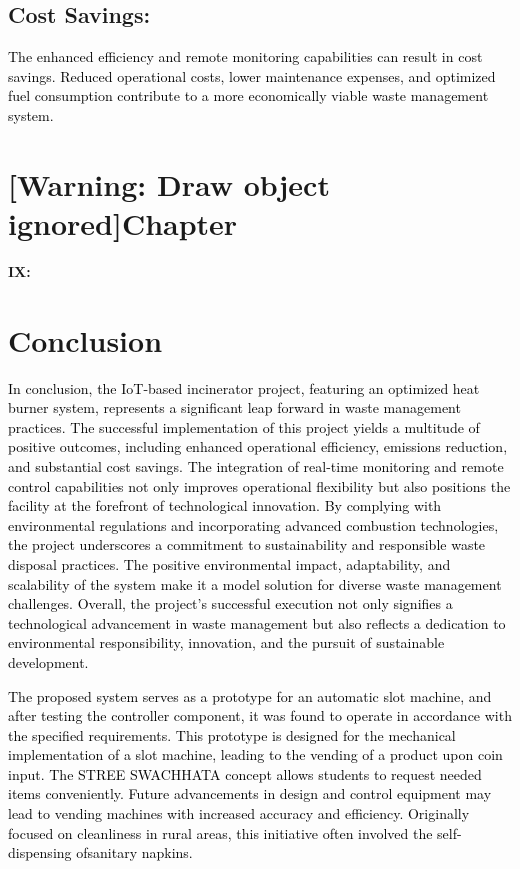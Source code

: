 \documentclass[letterpaper]{article}
\begin{document}
\subsection{Cost Savings:}
\textcolor{black}{The enhanced efficiency and remote monitoring capabilities can result in cost savings. Reduced
operational costs, lower maintenance expenses, and optimized fuel consumption contribute to a more economically viable
waste management system.}

\clearpage\setcounter{page}{1}\pagestyle{Convertedxx}
\section[Chapter]{[Warning: Draw object ignored]Chapter}
{\centering
\textbf{IX:}
\par}


\bigskip

\section[Conclusion]{Conclusion}

\bigskip

\textcolor{black}{In conclusion, the IoT-based incinerator project, featuring an optimized heat burner system,
represents a significant leap forward in waste management practices. The successful implementation of this project
yields a multitude of positive outcomes, including enhanced operational efficiency, emissions reduction, and
substantial cost savings. The integration of real-time monitoring and remote control capabilities not only improves
operational flexibility but also positions the facility at the forefront of technological innovation. By complying with
environmental regulations and incorporating advanced combustion technologies, the project underscores a commitment to
sustainability and responsible waste disposal practices. The positive environmental impact, adaptability, and
scalability of the system make it a model solution for diverse waste management challenges. Overall, the project's
successful execution not only signifies a technological advancement in waste management but also reflects a dedication
to environmental responsibility, innovation, and the pursuit of sustainable development.}

\textcolor{black}{The proposed system serves as a prototype for an automatic slot machine, and after testing the
controller component, it was found to operate in accordance with the specified requirements. This prototype is designed
for the mechanical implementation of a slot machine, leading to the vending of a product upon coin input. The
{\textquotedbl}STREE SWACHHATA{\textquotedbl} concept allows students to request needed items conveniently. Future
advancements in design and control equipment may lead to vending machines with increased accuracy and efficiency.
Originally focused on cleanliness in rural areas, this initiative often involved the self-dispensing ofsanitary
napkins.}
\end{document}
